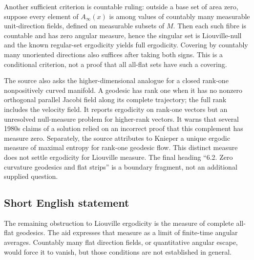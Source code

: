 \documentclass[11pt]{article}
\begin{document}
Another sufficient criterion is countable ruling: outside a base set of area zero, suppose every element of \(A_\infty(x)\) is among values of countably many measurable unit-direction fields, defined on measurable subsets of \(M\). Then each such fibre is countable and has zero angular measure, hence the singular set is Liouville-null and the known regular-set ergodicity yields full ergodicity. Covering by countably many unoriented directions also suffices after taking both signs. This is a conditional criterion, not a proof that all all-flat sets have such a covering.

The source also asks the higher-dimensional analogue for a closed rank-one nonpositively curved manifold. A geodesic has rank one when it has no nonzero orthogonal parallel Jacobi field along its complete trajectory; the full rank includes the velocity field. It reports ergodicity on rank-one vectors but an unresolved null-measure problem for higher-rank vectors. It warns that several 1980s claims of a solution relied on an incorrect proof that this complement has measure zero. Separately, the source attributes to Knieper a unique ergodic measure of maximal entropy for rank-one geodesic flow. This distinct measure does not settle ergodicity for Liouville measure. The final heading ``6.2. Zero curvature geodesics and flat strips'' is a boundary fragment, not an additional supplied question.
\subsection{Short English statement}
The remaining obstruction to Liouville ergodicity is the measure of complete all-flat geodesics. The aid expresses that measure as a limit of finite-time angular averages. Countably many flat direction fields, or quantitative angular escape, would force it to vanish, but those conditions are not established in general.
\end{document}
